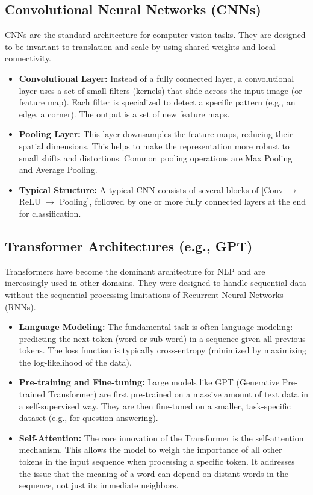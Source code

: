 \documentclass{article}
\begin{document}
\begin{multicols}{2}
	\subsection{Convolutional Neural Networks (CNNs)}
	CNNs are the standard architecture for computer vision tasks. They are designed to be invariant to translation and scale by using shared weights and local connectivity.
	\begin{itemize}
		\item \textbf{Convolutional Layer:} Instead of a fully connected layer, a convolutional layer uses a set of small filters (kernels) that slide across the input image (or feature map). Each filter is specialized to detect a specific pattern (e.g., an edge, a corner). The output is a set of new feature maps.
		\item \textbf{Pooling Layer:} This layer downsamples the feature maps, reducing their spatial dimensions. This helps to make the representation more robust to small shifts and distortions. Common pooling operations are Max Pooling and Average Pooling.
		\item \textbf{Typical Structure:} A typical CNN consists of several blocks of [Conv $\rightarrow$ ReLU $\rightarrow$ Pooling], followed by one or more fully connected layers at the end for classification.
	\end{itemize}

	\subsection{Transformer Architectures (e.g., GPT)}
	Transformers have become the dominant architecture for NLP and are increasingly used in other domains. They were designed to handle sequential data without the sequential processing limitations of Recurrent Neural Networks (RNNs).
	\begin{itemize}
		\item \textbf{Language Modeling:} The fundamental task is often language modeling: predicting the next token (word or sub-word) in a sequence given all previous tokens. The loss function is typically cross-entropy (minimized by maximizing the log-likelihood of the data).
		\item \textbf{Pre-training and Fine-tuning:} Large models like GPT (Generative Pre-trained Transformer) are first pre-trained on a massive amount of text data in a self-supervised way. They are then fine-tuned on a smaller, task-specific dataset (e.g., for question answering).
		\item \textbf{Self-Attention:} The core innovation of the Transformer is the self-attention mechanism. This allows the model to weigh the importance of all other tokens in the input sequence when processing a specific token. It addresses the issue that the meaning of a word can depend on distant words in the sequence, not just its immediate neighbors.
	\end{itemize}


\end{multicols}
\end{document}
